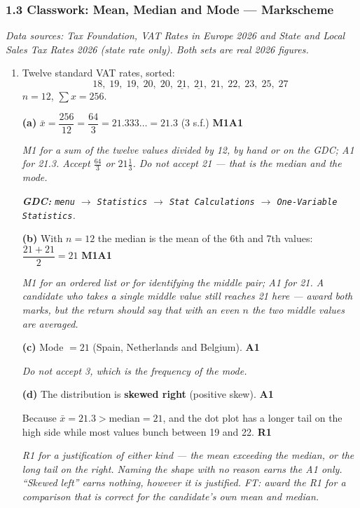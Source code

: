 \documentclass[12pt, twoside]{article}
\begin{document}
\subsubsection*{1.3 Classwork: Mean, Median and Mode --- Markscheme}

\emph{Data sources: Tax Foundation, \emph{VAT Rates in Europe 2026} and
\emph{State and Local Sales Tax Rates 2026} (state rate only). Both sets are
real 2026 figures.}

\begin{enumerate}[itemsep=0.3cm]

\item[1.] [Maximum mark: 8]

Twelve standard VAT rates, sorted:
$$18,\; 19,\; 19,\; 20,\; 20,\; \underline{21},\; \underline{21},\; 21,\; 22,\; 23,\; 25,\; 27$$
$n = 12$, $\sum x = 256$.

\textbf{(a)} $\bar{x} = \dfrac{256}{12} = \dfrac{64}{3} = 21.333\ldots = 21.3$
(3 s.f.) \hfill \textbf{M1A1}

\emph{M1 for a sum of the twelve values divided by 12, by hand or on the GDC;
A1 for 21.3. Accept $\frac{64}{3}$ or $21\frac{1}{3}$. Do not accept 21 --- that
is the median and the mode.}

\emph{\textbf{GDC:} \texttt{menu} $\rightarrow$ \texttt{Statistics}
$\rightarrow$ \texttt{Stat Calculations} $\rightarrow$
\texttt{One-Variable Statistics}.}

\textbf{(b)} With $n = 12$ the median is the mean of the 6th and 7th values:
$\dfrac{21 + 21}{2} = 21$ \hfill \textbf{M1A1}

\emph{M1 for an ordered list or for identifying the middle pair; A1 for 21.
A candidate who takes a single middle value still reaches 21 here --- award both
marks, but the return should say that with an even $n$ the two middle values
are averaged.}

\textbf{(c)} Mode $= 21$ (Spain, Netherlands and Belgium).
\hfill \textbf{A1}

\emph{Do not accept 3, which is the frequency of the mode.}

\textbf{(d)} The distribution is \textbf{skewed right} (positive skew).
\hfill \textbf{A1}

Because $\bar{x} = 21.3 > \text{median} = 21$, and the dot plot has a longer
tail on the high side while most values bunch between 19 and 22.
\hfill \textbf{R1}

\emph{R1 for a justification of either kind --- the mean exceeding the median,
or the long tail on the right. Naming the shape with no reason earns the A1
only. ``Skewed left'' earns nothing, however it is justified. FT: award the R1
for a comparison that is correct for the candidate's own mean and median.}


\end{enumerate}
\end{document}
